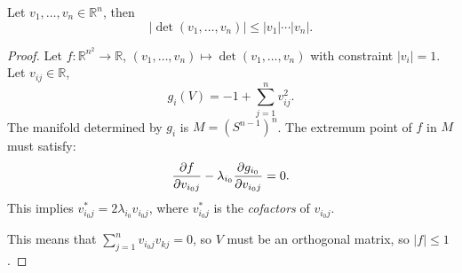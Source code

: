 \begin{proposition}
	Let $v_1,\dots,v_n\in \mathbb{R}^{n}$, then
	\[
	|\det(v_1,\dots,v_n)|\le |v_1|\cdots|v_n|.
	\]
\end{proposition}
\begin{proof}[Proof]
	Let $f : \mathbb{R}^{n^2}\to \mathbb{R}$,
	$(v_1,\dots,v_n)\mapsto \det(v_1,\dots,v_n)$ with constraint $|v_i| = 1$.
    Let $v_{ij}\in \mathbb{R}$,
	\[
	g_i(V) = -1 + \sum_{j=1}^{n} v_{ij}^2.
	\]
	The manifold determined by $g_i$ is $M = (S^{n-1}) ^n$.
	The extremum point of $f$ in $M$ must satisfy:
	\[
		\frac{\partial f}{\partial v_{i_0j}} - \lambda_{i_0}\frac{\partial g_{i_0}}{\partial v_{i_0j}} = 0.
	\]
	This implies $v_{i_0j}^* = 2\lambda_{i_0}v_{i_0j}$, where
	$v_{i_0j}^*$ is the \textit{cofactors} of $v_{i_0j}$.

	This means that $\sum_{j=1}^n v_{i_0j} v_{kj} = 0$,
	so $V$ must be an orthogonal matrix, so $|f|\le 1$.
\end{proof}
